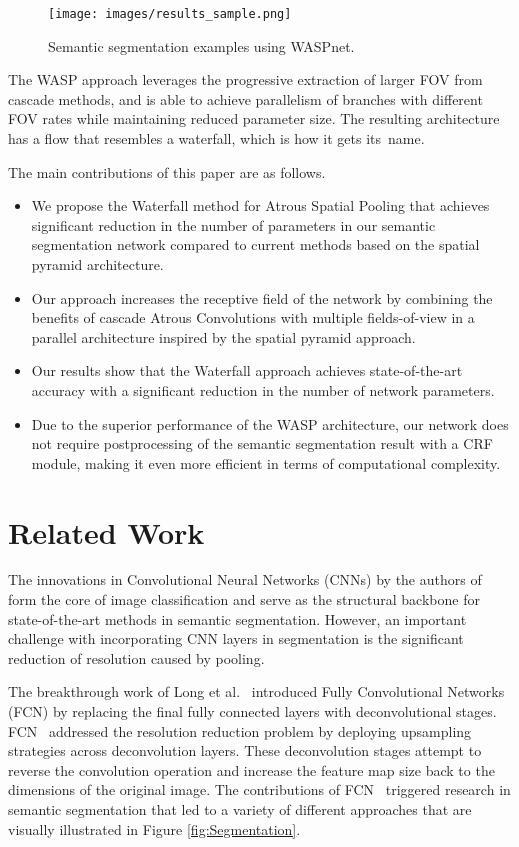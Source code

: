 \documentclass[sensors,article,accept,moreauthors,pdftex]{Definitions/mdpi}
\begin{document}
\begin{figure}[H]
\centering
\texttt{[image: images/results\_sample.png]}
\caption{Semantic segmentation examples using WASPnet.}
\label{fig:WASPnet_examples}
\end{figure}


The WASP approach leverages the progressive extraction of larger FOV from cascade methods, and is able to achieve parallelism of branches with different FOV rates while maintaining reduced parameter size. The resulting architecture has a flow that resembles a waterfall, which is how it gets its~name.

The main contributions of this paper are as follows.
\begin{itemize}[leftmargin=*,labelsep=5.8mm]
\item We propose the Waterfall method for Atrous Spatial Pooling that achieves significant reduction in the number of parameters in our semantic segmentation network compared to current methods based on the spatial pyramid architecture.
\item Our approach increases the receptive field of the network by combining the benefits of cascade Atrous Convolutions with multiple fields-of-view in a parallel architecture inspired by the spatial pyramid approach.
\item Our results show that the Waterfall approach achieves  state-of-the-art  accuracy  with a significant reduction in the number of network parameters.
\item Due to the superior performance of the WASP architecture, our network does not require postprocessing of the semantic segmentation result with a CRF module, making it even more efficient in terms of computational complexity.
\end{itemize}

\section{Related Work}

The innovations in Convolutional Neural Networks (CNNs) by the authors of~\cite{AlexNet,VGG,GoogleNet,ResNet} form the core of image classification and serve as the structural backbone for state-of-the-art methods in semantic segmentation. However, an important challenge with incorporating CNN layers in segmentation is the significant reduction of resolution caused by pooling.

The breakthrough work of Long et al.~\cite{FCN} introduced Fully Convolutional Networks (FCN) by replacing the final fully connected layers with deconvolutional stages.
FCN~\cite{FCN} addressed the resolution reduction problem by deploying upsampling strategies across deconvolution layers.
These deconvolution stages attempt to reverse the convolution operation and increase the feature map size back to the dimensions of the original image.
The contributions of FCN~\cite{FCN} triggered research in semantic segmentation that led to a variety of different approaches that are visually illustrated in Figure \ref{fig:Segmentation}.
\end{document}
